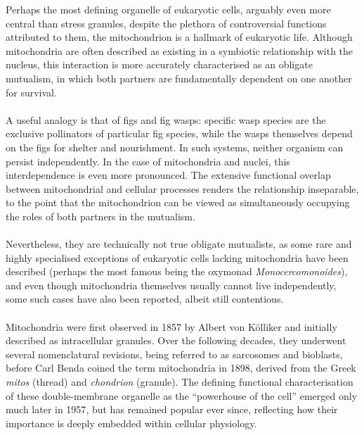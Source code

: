 Perhaps the most defining organelle of eukaryotic cells, arguably even more central than stress granules, despite the plethora of controversial functions attributed to them, the mitochondrion is a hallmark of eukaryotic life\cite{casanova_mitochondria_2023}. Although mitochondria are often described as existing in a symbiotic relationship with the nucleus, this interaction is more accurately characterised as an obligate mutualism, in which both partners are fundamentally dependent on one another for survival\cite{zachar_endosymbiosis_2020}.
\\
\\
A useful analogy is that of figs and fig wasps: specific wasp species are the exclusive pollinators of particular fig species, while the wasps themselves depend on the figs for shelter and nourishment\cite{segar_diversity_2025}. In such systems, neither organism can persist independently. In the case of mitochondria and nuclei, this interdependence is even more pronounced. The extensive functional overlap between mitochondrial and cellular processes renders the relationship inseparable, to the point that the mitochondrion can be viewed as simultaneously occupying the roles of both partners in the mutualism\cite{zachar_endosymbiosis_2020}.
\\
\\
Nevertheless, they are technically not true obligate mutualists, as some rare and highly specialised exceptions of eukaryotic cells lacking mitochondria have been described (perhaps the most famous being the oxymonad \textit{Monocercomonoides}\cite{karnkowska_eukaryote_2016}), and even though mitochondria themselves usually cannot live independently, some such cases have also been reported\cite{stephens_characterization_2020}, albeit still contentious.
\\
\\
Mitochondria were first observed in 1857 by Albert von Kölliker and initially described as intracellular granules\cite{andrieux_mitochondria_2021, harrington_mitochondria_2023}. Over the following decades, they underwent several nomenclatural revisions, being referred to as sarcosomes and bioblasts, before Carl Benda coined the term mitochondria in 1898, derived from the Greek \textit{mitos} (thread) and \textit{chondrion} (granule)\cite{andrieux_mitochondria_2021, harrington_mitochondria_2023}. The defining functional characterisation of these double-membrane organelle as the “powerhouse of the cell” emerged only much later in 1957\cite{siekevitz_powerhouse_1957}, but has remained popular ever since, reflecting how their importance is deeply embedded within cellular physiology. 


